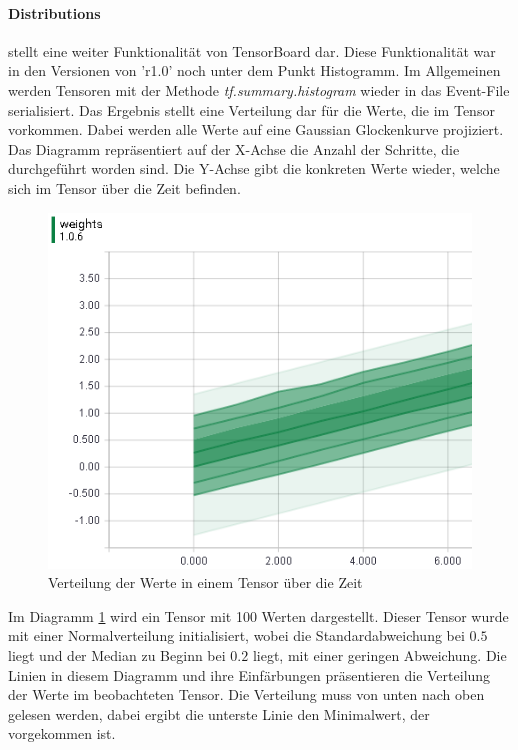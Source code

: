 \paragraph{Distributions} stellt eine weiter Funktionalität von TensorBoard dar.  %
Diese Funktionalität war in den Versionen von 'r1.0' noch unter dem Punkt Histogramm. 
Im Allgemeinen werden Tensoren mit der Methode \textit{tf.summary.histogram} wieder in das Event-File serialisiert. 
Das Ergebnis stellt eine Verteilung dar für die Werte, die im Tensor vorkommen. 
Dabei werden alle Werte auf eine Gaussian Glockenkurve projiziert. 
Das Diagramm repräsentiert auf der X-Achse die Anzahl der Schritte, die durchgeführt worden sind. 
Die Y-Achse gibt die konkreten Werte wieder, welche sich im Tensor über die Zeit befinden. 
\begin{figure}
	\centering
	\includegraphics[scale=0.8]{images/Distripution-small.png}
	\caption{Verteilung der Werte in einem Tensor über die Zeit}
	\label{fig:Verteilungsdiagram}
\end{figure}
Im Diagramm \ref{fig:Verteilungsdiagram} wird ein Tensor mit 100 Werten dargestellt. 
Dieser Tensor wurde mit einer Normalverteilung initialisiert, wobei die Standardabweichung bei $0.5$ liegt und der Median zu Beginn bei $0.2$ liegt, mit einer geringen Abweichung. 
Die Linien in diesem Diagramm und ihre Einfärbungen präsentieren die Verteilung der Werte im beobachteten Tensor. 
Die Verteilung muss von unten nach oben gelesen werden, dabei ergibt die unterste Linie den Minimalwert, der vorgekommen ist. 
